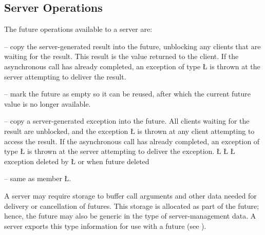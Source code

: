 \documentclass[openright,twoside]{report}
\begin{document}
\subsection{Server Operations}
\label{s:ServerOperations}

The future operations available to a server are:
\begin{prefix}
\item[\LGinlinetrue\LGbegin\lgrinde\L{\LB{\V{delivery}(\0\V{T}\0\V{result}\0)}}\endlgrinde\LGend{}]
-- copy the server-generated result into the future, unblocking any clients that are waiting for the result.
This result is the value returned to the client.
If the asynchronous call has already completed, an exception of type \LGinlinetrue\LGbegin\lgrinde\L{}\endlgrinde\LGend{} is thrown at the server attempting to deliver the result.
\item[\LGinlinetrue\LGbegin\lgrinde\L{\LB{\V{reset}}}\endlgrinde\LGend{}]
-- mark the future as empty so it can be reused, after which the current future value is no longer available.
\item[\LGinlinetrue\LGbegin\lgrinde\L{\LB{\V{exception}(\0\V{uBaseEvent}\0\*\0\V{cause}\0)}}\endlgrinde\LGend{}]
-- copy a server-generated exception into the future.
All clients waiting for the result are unblocked, and the exception \LGinlinetrue\LGbegin\lgrinde\L{}\endlgrinde\LGend{} is thrown at any client attempting to access the result.
If the asynchronous call has already completed, an exception of type \LGinlinetrue\LGbegin\lgrinde\L{}\endlgrinde\LGend{} is thrown at the server attempting to deliver the exception.
\LGinlinefalse\LGbegin\lgrinde
\L{}
\L{}
\L{}
\CE{}\endlgrinde\LGend
exception deleted by \LGinlinetrue\LGbegin\lgrinde\L{}\endlgrinde\LGend{} or when future deleted
\item[\LGinlinetrue\LGbegin\lgrinde\L{\LB{\V{delivery}(\0\V{uBaseEvent}\0\*\0\V{cause}\0)}}\endlgrinde\LGend{}]
-- same as member \LGinlinetrue\LGbegin\lgrinde\L{}\endlgrinde\LGend{}.
\end{prefix}

A server may require storage to buffer call arguments and other data needed for delivery or cancellation of futures.
This storage is allocated as part of the future;
hence, the future may also be generic in the type of server-management data.
A server exports this type information for use with a future (see ).
\end{document}
